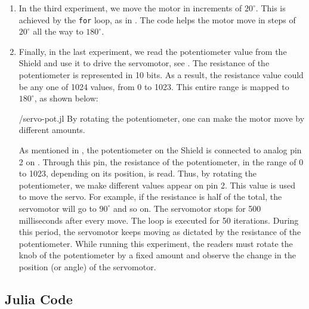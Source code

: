 \begin{enumerate}
        
  \item In the third experiment, we move the motor in increments of
        $20^\circ$.  This is achieved by the {\tt for} loop, as in
        . The code helps the motor move in steps of $20^\circ$ all
        the way to $180^\circ$.  
        
  \item Finally, in the last experiment, we read the potentiometer value
        from the Shield and use it to drive the servomotor, see
        .  The resistance of the potentiometer is
        represented in 10 bits.  As a result, the resistance value could be
        any one of 1024 values, from 0 to 1023.  This entire range is
        mapped to $180^\circ$, as shown below:
        
        {\LocSERjuliacode/servo-pot.jl}
        By rotating the potentiometer, one can make
        the motor move by different amounts.
        
        As mentioned in , the potentiometer on the Shield is connected 
        to analog pin 2 on \arduino. Through this pin, the resistance of the potentiometer, in the range of 0 to 1023,
        depending on its position, is read.  Thus, by rotating the
        potentiometer, we make different values appear on pin 2.  This value
        is used to move the servo.  For example, if the resistance is half
        of the total, the servomotor will go to $90^\circ$ and so on.  The
        servomotor stops for 500 milliseconds after every move.  The loop is
        executed for 50 iterations. During this period, the servomotor keeps moving as dictated by the
        resistance of the potentiometer. While running this experiment, the readers 
        must rotate the knob of the potentiometer by a fixed amount and observe 
        the change in the position (or angle) of the servomotor.   
        
\end{enumerate}

\subsection{Julia Code}
\lstset{style=mystyle}
\label{sec:servo-julia-code}

